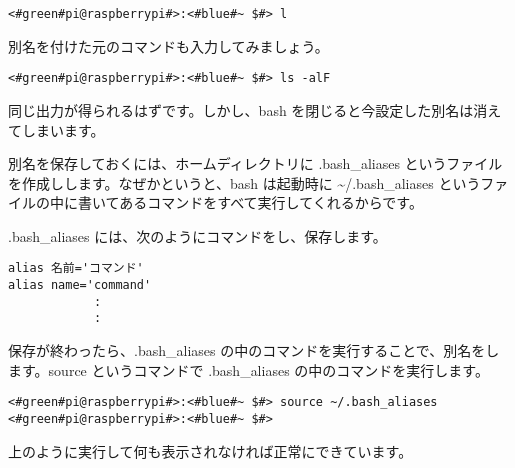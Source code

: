 \begin{lstlisting}[caption=別名の確認, label=confirmAlias]
<#green#pi@raspberrypi#>:<#blue#~ $#> l
\end{lstlisting}

別名を付けた元のコマンドも入力してみましょう。

\begin{lstlisting}[caption=元のコマンドの確認, label=confirmCommand]
<#green#pi@raspberrypi#>:<#blue#~ $#> ls -alF
\end{lstlisting}

同じ出力が得られるはずです。しかし、bash を閉じると今設定した別名は消えてしまいます。

別名を保存しておくには、ホームディレクトリに .bash{\_}aliases というファイルを作成しします。なぜかというと、bash は起動時に \textasciitilde/.bash{\_}aliases というファイルの中に書いてあるコマンドをすべて実行してくれるからです。

.bash{\_}aliases には、次のようにコマンドをし、保存します。
\begin{lstlisting}[caption=\textasciitilde/.bash\_aliasesの書き方1, label=bashAliasesGrammar1]
alias 名前='コマンド'
alias name='command'
            :
            :
\end{lstlisting}

保存が終わったら、.bash{\_}aliases の中のコマンドを実行することで、別名をします。source というコマンドで .bash{\_}aliases の中のコマンドを実行します。
\begin{lstlisting}[caption=\textasciitilde/.bash\_aliasesの読込, label=sourceBashAliases]
<#green#pi@raspberrypi#>:<#blue#~ $#> source ~/.bash_aliases
<#green#pi@raspberrypi#>:<#blue#~ $#>
\end{lstlisting}

上のように実行して何も表示されなければ正常にできています。


